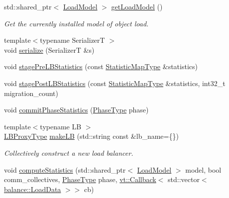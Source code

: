 \begin{DoxyCompactItemize}
std\+::shared\+\_\+ptr$<$ \hyperlink{structvt_1_1vrt_1_1collection_1_1balance_1_1_load_model}{Load\+Model} $>$ \hyperlink{structvt_1_1vrt_1_1collection_1_1balance_1_1_l_b_manager_aaa442ee117e8c9c978c77275cb3e6404}{get\+Load\+Model} ()
\begin{DoxyCompactList}\small\item\em Get the currently installed model of object load. \end{DoxyCompactList}\item 
{\footnotesize template$<$typename SerializerT $>$ }\\void \hyperlink{structvt_1_1vrt_1_1collection_1_1balance_1_1_l_b_manager_a99b59530c0557d779760394e9ff2557f}{serialize} (SerializerT \&s)
\item 
void \hyperlink{structvt_1_1vrt_1_1collection_1_1balance_1_1_l_b_manager_a252f9c83adfffa64bbad75c4bf89fce3}{stage\+Pre\+L\+B\+Statistics} (const \hyperlink{structvt_1_1vrt_1_1collection_1_1balance_1_1_l_b_manager_a3c6941b9c14a77e015047c659b817a85}{Statistic\+Map\+Type} \&statistics)
\item 
void \hyperlink{structvt_1_1vrt_1_1collection_1_1balance_1_1_l_b_manager_af60abfbc4e60ea0628f9e08eea7442f5}{stage\+Post\+L\+B\+Statistics} (const \hyperlink{structvt_1_1vrt_1_1collection_1_1balance_1_1_l_b_manager_a3c6941b9c14a77e015047c659b817a85}{Statistic\+Map\+Type} \&statistics, int32\+\_\+t migration\+\_\+count)
\item 
void \hyperlink{structvt_1_1vrt_1_1collection_1_1balance_1_1_l_b_manager_a151c019b8a964e0a13e5c49a568958e3}{commit\+Phase\+Statistics} (\hyperlink{namespacevt_a46ce6733d5cdbd735d561b7b4029f6d7}{Phase\+Type} phase)
\item 
{\footnotesize template$<$typename LB $>$ }\\\hyperlink{structvt_1_1vrt_1_1collection_1_1balance_1_1_l_b_manager_a8b1a7735366beb85c2c2ccc3912cdd80}{L\+B\+Proxy\+Type} \hyperlink{structvt_1_1vrt_1_1collection_1_1balance_1_1_l_b_manager_ababc0a22632d22eb8619bb6fd2b53dd4}{make\+LB} (std\+::string const \&lb\+\_\+name=\{\})
\begin{DoxyCompactList}\small\item\em Collectively construct a new load balancer. \end{DoxyCompactList}\item 
void \hyperlink{structvt_1_1vrt_1_1collection_1_1balance_1_1_l_b_manager_a7a917039501f03791938d2a7a5c5c7db}{compute\+Statistics} (std\+::shared\+\_\+ptr$<$ \hyperlink{structvt_1_1vrt_1_1collection_1_1balance_1_1_load_model}{Load\+Model} $>$ model, bool comm\+\_\+collectives, \hyperlink{namespacevt_a46ce6733d5cdbd735d561b7b4029f6d7}{Phase\+Type} phase, \hyperlink{namespacevt_a57b238783d05de96bc2c4027f7073b7f}{vt\+::\+Callback}$<$ std\+::vector$<$ \hyperlink{structvt_1_1vrt_1_1collection_1_1balance_1_1_load_data}{balance\+::\+Load\+Data} $>$$>$ cb)
$$
\end{DoxyCompactItemize}
